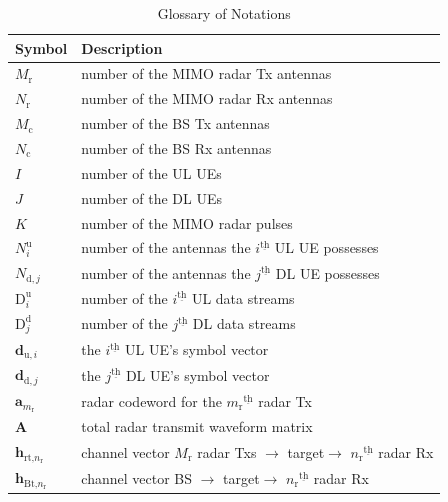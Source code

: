 \documentclass[10pt,journal]{IEEEtran}
\newcommand{\paren}[1]{\left({#1}\right)}
\newcommand{\ith}[1]    {{#1}^{\underline{\text{th}}}}
\newcommand{\rr}{_\mathrm{r}}
\newcommand{\cc}{_\mathrm{c}}
\theoremstyle{definition}
\begin{document}
	\begin{table}[!t]
		\color{red}
		\renewcommand{\arraystretch}{1.3} 
		\caption{Glossary of Notations}
		\label{table_parameter}
		\centering
		\begin{tabular}{l||p{66mm}}
			\hline
			\bfseries Symbol & \bfseries Description\\
			\hline
			$\mathit{M}\rr$& number of the MIMO radar Tx antennas\\
			\hline
			$\mathit{N}\rr$&number of the MIMO radar Rx antennas\\
			\hline
			$\mathit{M}\cc$&number of the BS Tx antennas\\
			\hline 
			$\mathit{N}\cc$&number of the BS Rx antennas\\
			\hline
			$\mathit{I}$& number of the UL UEs\\
			\hline
			$\mathit{J}$& number of the DL UEs\\
			\hline
			$K$&number of the MIMO radar pulses %
			\\
			\hline
			$N^{\textrm{u}}_i$&number of the antennas the $\ith{i}$ UL UE possesses \\
			\hline
			$\mathit{N}_{\mathrm{d},j}$&number of the antennas the $\ith{j}$ DL UE possesses \\
			\hline
			$\mathrm{D}^\textrm{u}_{i}$&number of the $\ith{i}$ UL data streams \\
			\hline
			$\mathrm{D}^\textrm{d}_{j}$&number of the $\ith{j}$ DL data streams\\
			\hline
			$\mathbf{d}_{\mathrm{u},i}$&the $\ith{i}$ UL UE's symbol vector  \\
			\hline
			$\mathbf{d}_{\mathrm{d},j}$&the $\ith{j}$ DL UE's symbol vector \\
			\hline
			$\mathbf{a}_{m\rr}$& radar codeword for the $\ith{m\rr}$ radar Tx\\
			\hline
			$\mathbf{A}$& total radar transmit waveform matrix\\
			\hline
			$\mathbf{h}_{\text{rt,}n\rr}$& channel vector $M\rr$ radar Txs $\rightarrow$ target$\rightarrow$ $\ith{n\rr}$ radar Rx\\
			\hline
			$\mathbf{h}_{\text{Bt,}n\rr}$&  channel vector BS $\rightarrow$ target$\rightarrow$ $\ith{n\rr}$ radar Rx\\

\end{tabular}
\end{table}
\end{document}
